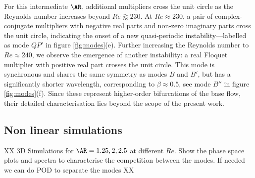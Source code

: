 For this intermediate $\AR$, additional multipliers cross the unit circle as the Reynolds number increases beyond $Re \gtrapprox 230$. At $Re \approx 230$, a pair of complex-conjugate multipliers with negative real parts and non-zero imaginary parts cross the unit circle, indicating the onset of a new quasi-periodic instability---labelled as mode $QP'$ in figure \ref{fig:modes}(e). Further increasing the Reynolds number to $Re \approx 240$, we observe the emergence of another instability: a real Floquet multiplier with positive real part crosses the unit circle. This mode is synchronous and shares the same symmetry as modes $B$ and $B'$, but has a significantly shorter wavelength, corresponding to $\beta \approx 0.5$, see mode $B''$ in figure \ref{fig:modes}(f). Since these represent higher-order bifurcations of the base flow, their detailed characterisation lies beyond the scope of the present work.

\subsection{Non linear simulations}

XX 3D Simulations for $\AR=1.25, 2, 2.5$ at different $Re$. Show the phase space plots and spectra to characterise the competition between the modes. If needed we can do POD to separate the modes XX


